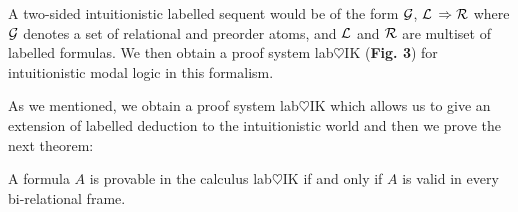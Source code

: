 \documentclass[twoside]{aiml18}
\begin{document}
A two-sided intuitionistic labelled sequent would be of the form $\mathcal{G}$, $\mathcal{L} $ $\Rightarrow \mathcal{R}$ where $\mathcal{G}$ denotes a set of relational and preorder atoms, and $\mathcal{L}$ and $\mathcal{R}$ are multiset of labelled formulas. We then obtain a proof system lab$\heartsuit $IK (\textbf{Fig. 3}) for intuitionistic modal logic in this formalism.

As we mentioned, we obtain a proof system lab$\heartsuit$IK which allows us to give an extension of labelled deduction to the intuitionistic world and then we prove the next theorem:

\begin{theorem}
A formula $A$ is provable in the calculus lab$\heartsuit$IK if and only if $A$ is valid in every bi-relational frame.
\end{theorem}
 
\end{document}
